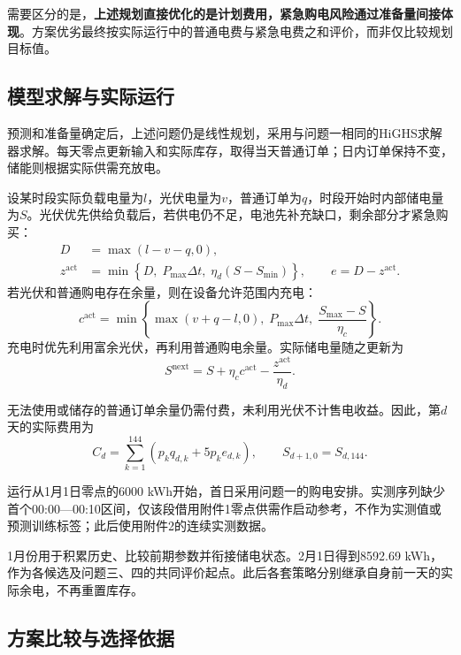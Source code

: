 需要区分的是，\textbf{上述规划直接优化的是计划费用，紧急购电风险通过准备量间接体现}。方案优劣最终按实际运行中的普通电费与紧急电费之和评价，而非仅比较规划目标值。

\subsection{模型求解与实际运行}

预测和准备量确定后，上述问题仍是线性规划，采用与问题一相同的HiGHS求解器求解。每天零点更新输入和实际库存，取得当天普通订单；日内订单保持不变，储能则根据实际供需充放电。

设某时段实际负载电量为$l$，光伏电量为$v$，普通订单为$q$，时段开始时内部储电量为$S$。光伏优先供给负载后，若供电仍不足，电池先补充缺口，剩余部分才紧急购买：
\begin{align}
D&=\max(l-v-q,0),\label{eq:q2_actual_deficit}\\
z^{\mathrm{act}}&=\min\left\{D,\;P_{\max}\Delta t,\;\eta_d(S-S_{\min})\right\},
\qquad e=D-z^{\mathrm{act}}.\label{eq:q2_emergency}
\end{align}
若光伏和普通购电存在余量，则在设备允许范围内充电：
\begin{equation}
c^{\mathrm{act}}=\min\left\{\max(v+q-l,0),\;P_{\max}\Delta t,\;\frac{S_{\max}-S}{\eta_c}\right\}.
\label{eq:q2_actual_charge}
\end{equation}
充电时优先利用富余光伏，再利用普通购电余量。实际储电量随之更新为
\begin{equation}
S^{\mathrm{next}}=S+\eta_c c^{\mathrm{act}}-\frac{z^{\mathrm{act}}}{\eta_d}.
\label{eq:q2_actual_soc}
\end{equation}

无法使用或储存的普通订单余量仍需付费，未利用光伏不计售电收益。因此，第$d$天的实际费用为
\begin{equation}
C_d=\sum_{k=1}^{144}\left(p_kq_{d,k}+5p_ke_{d,k}\right),
\qquad S_{d+1,0}=S_{d,144}.
\label{eq:q2_daily_cost}
\end{equation}

运行从1月1日零点的6000 kWh开始，首日采用问题一的购电安排。实测序列缺少首个00:00—00:10区间，仅该段借用附件1零点供需作启动参考，不作为实测值或预测训练标签；此后使用附件2的连续实测数据。

1月份用于积累历史、比较前期参数并衔接储电状态。2月1日得到8592.69 kWh，作为各候选及问题三、四的共同评价起点。此后各套策略分别继承自身前一天的实际余电，不再重置库存。

\subsection{方案比较与选择依据}

